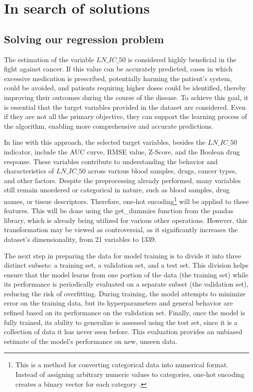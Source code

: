 \chapter{In search of solutions}\label{cap:diseño}

\section{Solving our regression problem}

The estimation of the variable \(LN\_IC\_{50}\) is considered highly beneficial in the fight against cancer. If this value can be accurately predicted, cases in which excessive medication is prescribed, potentially harming the patient's system, could be avoided, and patients requiring higher doses could be identified, thereby improving their outcomes during the course of the disease. To achieve this goal, it is essential that the target variables provided in the dataset are considered. Even if they are not all the primary objective, they can support the learning process of the algorithm, enabling more comprehensive and accurate predictions.

In line with this approach, the selected target variables, besides the \(LN\_IC\_{50}\) indicator, include the AUC curve, RMSE value, Z-Score, and the Boolean drug response. These variables contribute to understanding the behavior and characteristics of \(LN\_IC\_{50}\) across various blood samples, drugs, cancer types, and other factors. Despite the preprocessing already performed, many variables still remain unordered or categorical in nature, such as blood samples, drug names, or tissue descriptors. Therefore, one-hot encoding\footnote{This is a method for converting categorical data into numerical format. Instead of assigning arbitrary numeric values to categories, one-hot encoding creates a binary vector for each category \cite{amit2024onehot}.} will be applied to these features. This will be done using the get\_dummies function from the pandas library, which is already being utilized for various other operations. However, this transformation may be viewed as controversial, as it significantly increases the dataset's dimensionality, from 21 variables to 1339.

The next step in preparing the data for model training is to divide it into three distinct subsets: a training set, a validation set, and a test set. This division helps ensure that the model learns from one portion of the data (the training set) while its performance is periodically evaluated on a separate subset (the validation set), reducing the risk of overfitting. During training, the model attempts to minimize error on the training data, but its hyperparameters and general behavior are refined based on its performance on the validation set. Finally, once the model is fully trained, its ability to generalize is assessed using the test set, since it is a collection of data it has never seen before. This evaluation provides an unbiased estimate of the model's performance on new, unseen data.

